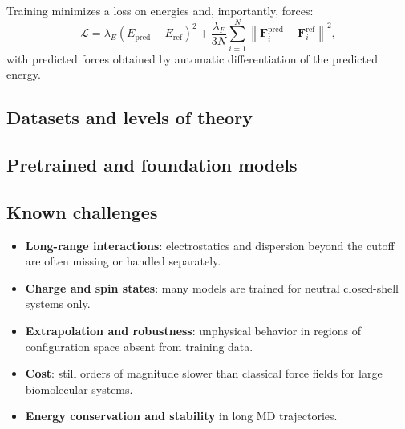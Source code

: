 \documentclass[english,course]{lecture}
\begin{document}
Training minimizes a loss on energies and, importantly, forces:
\[
\mathcal{L} = \lambda_E \left(E_{\text{pred}} - E_{\text{ref}}\right)^2 + \frac{\lambda_F}{3N}\sum_{i=1}^{N} \left\lVert \mathbf{F}_{i}^{\text{pred}} - \mathbf{F}_{i}^{\text{ref}} \right\rVert^2,
\]
with predicted forces obtained by automatic differentiation of the predicted energy.

\subsection{Datasets and levels of theory}


\subsection{Pretrained and foundation models}


\subsection{Known challenges}

\begin{itemize}
    \item \textbf{Long-range interactions}: electrostatics and dispersion beyond the cutoff are often missing or handled separately.
    \item \textbf{Charge and spin states}: many models are trained for neutral closed-shell systems only.
    \item \textbf{Extrapolation and robustness}: unphysical behavior in regions of configuration space absent from training data.
    \item \textbf{Cost}: still orders of magnitude slower than classical force fields for large biomolecular systems.
    \item \textbf{Energy conservation and stability} in long MD trajectories.
\end{itemize}

\vfill
\eject

\end{document}
